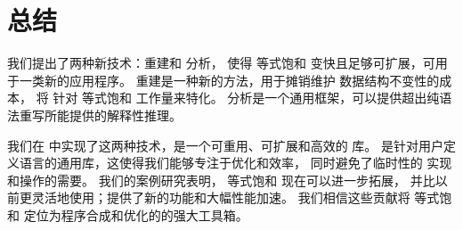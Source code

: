 \section{总结}
\label{sec:conclusion}

我们提出了两种新技术：重建和 \eclass 分析，
  使得 等式饱和 变快且足够可扩展，可用于一类新的应用程序。
重建是一种新的方法，用于摊销维护 \egraph 数据结构不变性的成本，
  将 \egraph 针对 等式饱和 工作量来特化。 %
\eclass 分析是一个通用框架，可以提供超出纯语法重写所能提供的解释性推理。

我们在 \egg 中实现了这两种技术，\egg 是一个可重用、可扩展和高效的 \egraph 库。
\Egg 是针对用户定义语言的通用库，这使得我们能够专注于优化和效率，
  同时避免了临时性的 \egraph 实现和操作的需要。 %
我们的案例研究表明， 等式饱和 现在可以进一步拓展，%
  并比以前更灵活地使用；\egg 提供了新的功能和大幅性能加速。
我们相信这些贡献将 等式饱和 定位为程序合成和优化的的强大工具箱。

